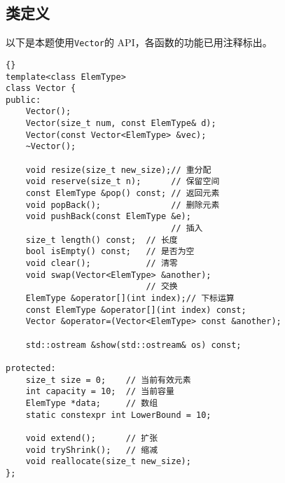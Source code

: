 \subsection{类定义}
以下是本题使用\lstinline{Vector}的 API，各函数的功能已用注释标出。
\begin{lstlisting}[morendkeywords={Vector}, firstnumber=637, caption=LinkedList 类定义]{}
template<class ElemType>
class Vector {
public:
    Vector();
    Vector(size_t num, const ElemType& d);
    Vector(const Vector<ElemType> &vec);
    ~Vector();

    void resize(size_t new_size);// 重分配
    void reserve(size_t n);      // 保留空间
    const ElemType &pop() const; // 返回元素
    void popBack();              // 删除元素
    void pushBack(const ElemType &e);
                                 // 插入
    size_t length() const;  // 长度
    bool isEmpty() const;   // 是否为空
    void clear();           // 清零
    void swap(Vector<ElemType> &another);
                            // 交换
    ElemType &operator[](int index);// 下标运算
    const ElemType &operator[](int index) const;
    Vector &operator=(Vector<ElemType> const &another);

    std::ostream &show(std::ostream& os) const;

protected:
    size_t size = 0;    // 当前有效元素
    int capacity = 10;  // 当前容量
    ElemType *data;     // 数组
    static constexpr int LowerBound = 10;

    void extend();      // 扩张
    void tryShrink();   // 缩减
    void reallocate(size_t new_size);
};
\end{lstlisting}
\vspace*{1cm}

